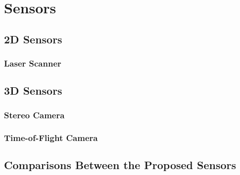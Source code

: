 

\chapter{Sensors}




\section{2D Sensors}

\subsection{Laser Scanner}





\section{3D Sensors}


\subsection{Stereo Camera}



\subsection{Time-of-Flight Camera}




\section{Comparisons Between the Proposed Sensors}

